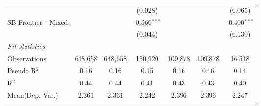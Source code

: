 \begin{tabular}{lcccccc}
                        &               &               & (0.028)        &               &               & (0.065)\\   
   SB Frontier - Mixed  &               &               & -0.560$^{***}$ &               &               & -0.400$^{***}$\\   
                        &               &               & (0.044)        &               &               & (0.130)\\   
   \midrule
   \emph{Fit statistics}\\
   Observations         & 648,658       & 648,658       & 150,920        & 109,878       & 109,878       & 16,518\\  
   Pseudo R$^2$         & 0.16          & 0.16          & 0.15           & 0.16          & 0.16          & 0.14\\  
   R$^2$                & 0.44          & 0.44          & 0.41           & 0.43          & 0.43          & 0.40\\  
Mean(Dep. Var.) & 2.361 & 2.361 & 2.242 & 2.396 & 2.396 & 2.247 \\
   

\end{tabular}
